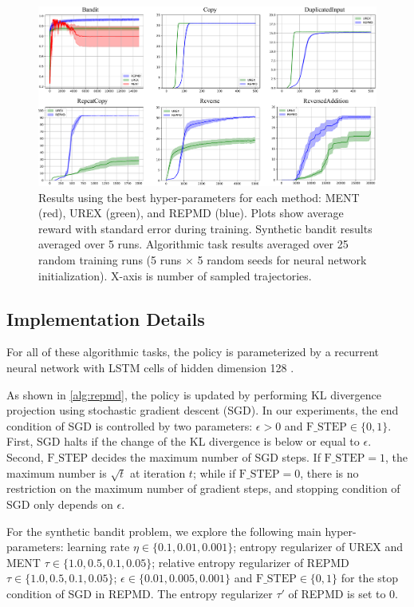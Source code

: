 \begin{figure}[t]
\begin{center}
\includegraphics[width=0.85\linewidth]{./fig1.pdf}
\end{center}
\caption{
Results using the best hyper-parameters for each method: MENT (red), UREX (green), and REPMD (blue).
Plots show average reward with standard error during training. Synthetic bandit results averaged over 5 runs. Algorithmic task results averaged over 25 random training runs (5 runs $\times$ 5 random seeds for neural network initialization). X-axis is number of sampled trajectories. } 
\label{fig:results}
\end{figure}

\subsection{Implementation Details}
\label{subsec:implementation}
For all of these algorithmic tasks, the policy is parameterized by a recurrent neural network with LSTM cells of hidden dimension 128 \citep{hochreiter1997long}. 

As shown in \cref{alg:repmd}, the policy is updated by performing KL divergence projection using stochastic gradient descent (SGD). In our experiments, the end condition of SGD is controlled by two parameters: $\epsilon > 0$ and $\text{F\_STEP}\in \{0,1 \}$. First, SGD halts if the change of the KL divergence is below or equal to $\epsilon$. Second, $\text{F\_STEP}$ decides the maximum number of SGD steps. If $\text{F\_STEP}=1$, the maximum number is $\sqrt{t}$ at iteration $t$; while if $\text{F\_STEP}=0$, there is no restriction on the maximum number of gradient steps, and stopping condition of SGD only depends on $\epsilon$.

For the synthetic bandit problem, we explore the following main hyper-parameters: learning rate $\eta \in \{0.1, 0.01, 0.001\}$; entropy regularizer of UREX and MENT $\tau\in \{1.0, 0.5, 0.1, 0.05\}$; relative entropy regularizer of REPMD $\tau\in \{1.0, 0.5, 0.1, 0.05\}$; $\epsilon\in \{0.01, 0.005, 0.001\}$ and $\text{F\_STEP}\in \{0,1\}$ for the stop condition of SGD in REPMD. The entropy regularizer $\tau'$ of REPMD is set to 0.

